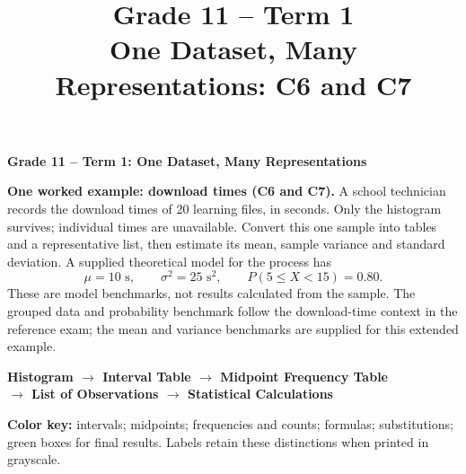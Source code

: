 \makeatletter
{}
\makeatother


\title{Grade 11 -- Term 1 \\ One Dataset, Many Representations: C6 and C7}
\author{}
\date{}
\pagestyle{empty}
\newcommand{\iv}[1]{\textcolor{IntervalColor}{#1}}
\newcommand{\mv}[1]{\textcolor{MidpointColor}{#1}}
\newcommand{\fq}[1]{\textcolor{FrequencyColor}{#1}}
\newcommand{\fm}[1]{\textcolor{FormulaColor}{#1}}
\newcommand{\su}[1]{\textcolor{black!75}{#1}}
\newcommand{\resultbox}[1]{\par\noindent\fcolorbox{ResultColor}{ResultColor!7}{\parbox{\dimexpr\linewidth-2\fboxsep-2\fboxrule\relax}{#1}}\par}
\newcommand{\pageheading}[1]{\begin{center}{\large\bfseries #1}\end{center}\vspace{-4mm}}

\vspace*{-15mm}
\pageheading{Grade 11 -- Term 1: One Dataset, Many Representations}
\textbf{One worked example: download times (C6 and C7).}
A school technician records the download times of 20 learning files, in seconds.
Only the histogram survives; individual times are unavailable. Convert this one
sample into tables and a representative list, then estimate its mean, sample
variance and standard deviation. A supplied theoretical model for the process has
\[
\mu=10\text{ s},\qquad \sigma^2=25\text{ s}^2,\qquad P(5\le X<15)=0.80.
\]
These are model benchmarks, not results calculated from the sample. The grouped
data and probability benchmark follow the download-time context in the reference
exam; the mean and variance benchmarks are supplied for this extended example.
\begin{center}\small\bfseries
Histogram $\longrightarrow$ Interval Table $\longrightarrow$ Midpoint Frequency Table\\
$\longrightarrow$ List of Observations $\longrightarrow$ Statistical Calculations
\end{center}
\textbf{Color key:} \iv{intervals}; \mv{midpoints}; \fq{frequencies and counts};
\fm{formulas}; \su{substitutions}; green boxes for final results.
Labels retain these distinctions when printed in grayscale.
